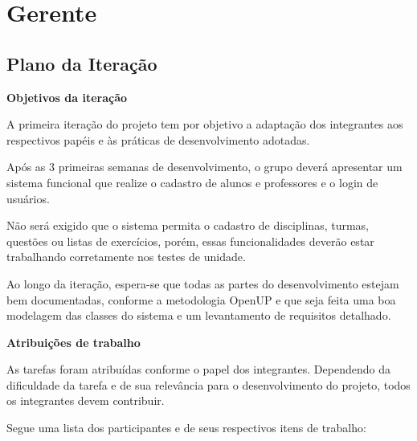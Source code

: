 \documentclass[12pt,letterpaper]{article}
\begin{document}
\pagebreak
\section{Gerente}

\subsection{Plano da Iteração}

\vspace{1cm}
{\large {\bf Objetivos da iteração}}
\vspace{0.5cm}


A primeira iteração do projeto tem por objetivo a adaptação dos integrantes aos respectivos papéis e às práticas de desenvolvimento adotadas.

Após as 3 primeiras semanas de desenvolvimento, o grupo deverá apresentar um sistema funcional que realize o cadastro de alunos e professores e o login de usuários.

Não será exigido que o sistema permita o cadastro de disciplinas, turmas, questões ou listas de exercícios, porém, essas funcionalidades deverão estar trabalhando corretamente nos testes  de unidade.

Ao longo da iteração, espera-se que todas as partes do desenvolvimento estejam bem documentadas, conforme a metodologia OpenUP e que seja feita uma boa modelagem das classes do sistema e um levantamento de requisitos detalhado.

\vspace{1cm}
{\large {\bf Atribuições de trabalho}}
\vspace{0.5cm}

As tarefas foram atribuídas conforme o papel dos integrantes. Dependendo da dificuldade da tarefa e de sua relevância para o desenvolvimento do projeto, todos os integrantes devem contribuir.

Segue uma lista dos participantes e de seus respectivos itens de trabalho:
\end{document}
